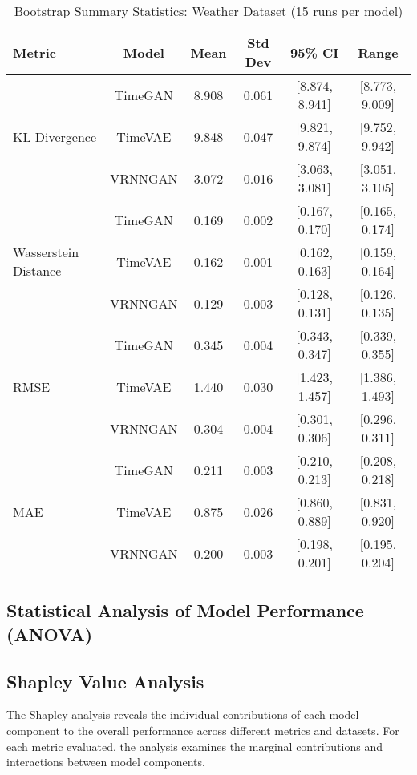 \documentclass{article}
\begin{document}
\begin{table}[H]
    \centering
    \caption{Bootstrap Summary Statistics: Weather Dataset (15 runs per model)}
    \label{tab:bootstrap_weather}
    \small
    \begin{tabular}{lccccc}
        \toprule
        \textbf{Metric} & \textbf{Model} & \textbf{Mean} & \textbf{Std Dev} & \textbf{95\% CI} & \textbf{Range} \\
        \midrule
        \multirow{3}{*}{KL Divergence} 
    & TimeGAN   & 8.908 & 0.061 & [8.874, 8.941] & [8.773, 9.009] \\
    & TimeVAE   & 9.848 & 0.047 & [9.821, 9.874] & [9.752, 9.942] \\
    & VRNNGAN   & 3.072 & 0.016 & [3.063, 3.081] & [3.051, 3.105] \\
    \midrule
    \multirow{3}{*}{Wasserstein Distance} 
    & TimeGAN   & 0.169 & 0.002 & [0.167, 0.170] & [0.165, 0.174] \\
    & TimeVAE   & 0.162 & 0.001 & [0.162, 0.163] & [0.159, 0.164] \\
    & VRNNGAN   & 0.129 & 0.003 & [0.128, 0.131] & [0.126, 0.135] \\
    \midrule
    \multirow{3}{*}{RMSE} 
    & TimeGAN   & 0.345 & 0.004 & [0.343, 0.347] & [0.339, 0.355] \\
    & TimeVAE   & 1.440 & 0.030 & [1.423, 1.457] & [1.386, 1.493] \\
    & VRNNGAN   & 0.304 & 0.004 & [0.301, 0.306] & [0.296, 0.311] \\
    \midrule
    \multirow{3}{*}{MAE} 
    & TimeGAN   & 0.211 & 0.003 & [0.210, 0.213] & [0.208, 0.218] \\
    & TimeVAE   & 0.875 & 0.026 & [0.860, 0.889] & [0.831, 0.920] \\
    & VRNNGAN   & 0.200 & 0.003 & [0.198, 0.201] & [0.195, 0.204] \\
    \bottomrule
\end{tabular}
\end{table}

\subsection{Statistical Analysis of Model Performance (ANOVA)}

\subsection{Shapley Value Analysis}
The Shapley analysis reveals the individual contributions of each model component to the overall performance across different metrics and datasets. For each metric evaluated, the analysis examines the marginal contributions and interactions between model components.
\end{document}
